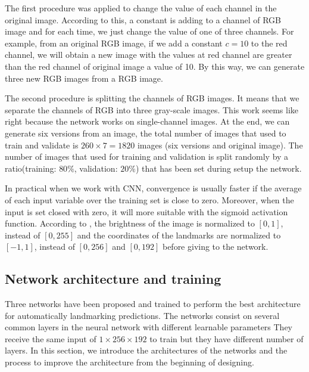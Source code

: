 \documentclass[conference]{IEEEtran}
\begin{document}
The first procedure was applied to change the value of each channel in the original image. According to this, a constant is adding to a channel of RGB image and for each time, we just change the value of one of three channels. For example, from an original RGB image, if we add a constant $c = 10$ to the red channel, we will obtain a new image with the values at red channel are greater than the red channel of original image a value of 10. By this way, we can generate three new RGB images from a RGB image.

The second procedure is splitting the channels of RGB images. It means that we separate the channels of RGB into three gray-scale images. This work seems like right because the network works on single-channel images. At the end, we can generate six versions from an image, the total number of images that used to train and validate is $260 \times 7 = 1820$ images (six versions and original image). The number of images that used for training and validation is split randomly by a ratio(training: $80\%$, validation: $20\%$) that has been set during setup the network.

In practical when we work with CNN, convergence is usually faster if the average of each input variable over the training set is close to zero. Moreover, when the input is set closed with zero, it will more suitable with the sigmoid activation function\cite{lecun2012efficient}. According to \cite{lecun2012efficient}, the brightness of the image is normalized to $[0,1]$, instead of $[0,255]$ and the coordinates of the landmarks are normalized to $[-1,1]$, instead of $[0,256]$ and $[0,192]$ before giving to the network.
\subsection{Network architecture and training}
Three networks have been proposed and trained to perform the best architecture for automatically landmarking predictions. The networks consist on several common layers in the neural network with different learnable parameters They receive the same input of $1 \times 256 \times 192$ to train but they have different number of layers. In this section, we introduce the architectures of the networks and the process to improve the architecture from the beginning of designing.
\end{document}
